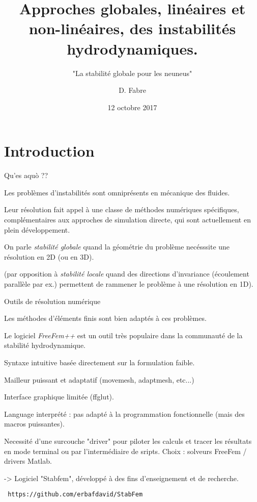 \documentclass{beamer}
\title{Approches globales, linéaires et non-linéaires, des instabilités hydrodynamiques.
}
\subtitle{"La stabilité globale pour les neuneus"}
\author{D. Fabre}
\institute{IMFT, groupe Interface}
\date{12 octobre 2017}
\newcommand{\ssp}{\vspace{.2cm} }
\begin{document}
\begin{frame}

\titlepage

\end{frame}

\section{Introduction}

\begin{frame}{Qu'es aquò ?? } 


Les problèmes d'instabilités sont omniprésents en mécanique des fluides. 

\ssp

Leur résolution fait appel à une classe de méthodes numériques spécifiques, 
complémentaires aux approches de simulation directe, qui sont actuellement en plein développement. 

\ssp


On parle {\em stabilité globale} quand la géométrie du problème necésssite une résolution en 2D (ou en 3D).

\ssp

(par opposition à {\em stabilité locale} quand des directions d'invariance (écoulement parallèle par ex.) permettent de rammener le problème à une résolution en 1D).


\end{frame}


\begin{frame}{Outils de résolution numérique}

Les méthodes d'éléments finis sont bien adaptés à ces problèmes.

Le logiciel {\em FreeFem++} est un outil très populaire dans la communauté de la stabilité hydrodynamique.

\ssp


{\color{green} \Smiley{} \quad } Syntaxe intuitive basée directement sur la formulation faible.

{\color{green} \Smiley{} \quad } Mailleur puissant et adaptatif (movemesh, adaptmesh, etc...)

{\color{red} \Frowny{} \quad } Interface graphique limitée (ffglut).

{\color{red} \Frowny{} \quad } Language interprété : pas adapté à la programmation fonctionnelle (mais des macros puissantes).
 
 \ssp

Necessité d'une surcouche "driver"  pour piloter les calculs et tracer les résultats en mode terminal ou par l'intermédiaire de sripts.
\ssp 
Choix : solveurs FreeFem / drivers Matlab.

\ssp -> Logiciel "Stabfem", développé à des fins d'enseignement et de recherche.


\ssp
{\color{orange}
\verb! https://github.com/erbafdavid/StabFem !
}

\end{frame}
\end{document}
